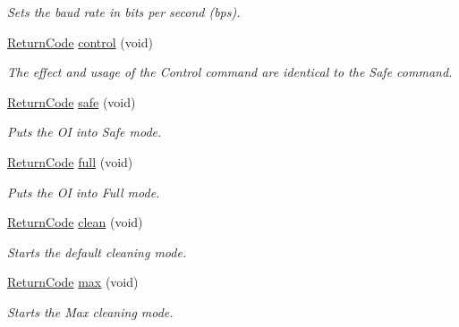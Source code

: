 \begin{DoxyCompactItemize}
\begin{DoxyCompactList}\small\item\em Sets the baud rate in bits per second (bps). \end{DoxyCompactList}\item 
\hyperlink{classroomba_1_1series500_1_1oi_1_1_o_i_encoder_ac2c8ad2f0306050926f89882d74696cc}{Return\+Code} \hyperlink{classroomba_1_1series500_1_1oi_1_1_o_i_encoder_ad32a31a2fb7e5457685428949f14d25c}{control} (void)
\begin{DoxyCompactList}\small\item\em The effect and usage of the Control command are identical to the Safe command. \end{DoxyCompactList}\item 
\hyperlink{classroomba_1_1series500_1_1oi_1_1_o_i_encoder_ac2c8ad2f0306050926f89882d74696cc}{Return\+Code} \hyperlink{classroomba_1_1series500_1_1oi_1_1_o_i_encoder_a01413ddf9d88eb62229dad6d4ed1801d}{safe} (void)
\begin{DoxyCompactList}\small\item\em Puts the O\+I into Safe mode. \end{DoxyCompactList}\item 
\hyperlink{classroomba_1_1series500_1_1oi_1_1_o_i_encoder_ac2c8ad2f0306050926f89882d74696cc}{Return\+Code} \hyperlink{classroomba_1_1series500_1_1oi_1_1_o_i_encoder_aab8b00ade2c7a6fb9568ef1920734b5a}{full} (void)
\begin{DoxyCompactList}\small\item\em Puts the O\+I into Full mode. \end{DoxyCompactList}\item 
\hyperlink{classroomba_1_1series500_1_1oi_1_1_o_i_encoder_ac2c8ad2f0306050926f89882d74696cc}{Return\+Code} \hyperlink{classroomba_1_1series500_1_1oi_1_1_o_i_encoder_a93e858788e85afdf4a04237eb5c526e0}{clean} (void)
\begin{DoxyCompactList}\small\item\em Starts the default cleaning mode. \end{DoxyCompactList}\item 
\hyperlink{classroomba_1_1series500_1_1oi_1_1_o_i_encoder_ac2c8ad2f0306050926f89882d74696cc}{Return\+Code} \hyperlink{classroomba_1_1series500_1_1oi_1_1_o_i_encoder_a027e42d59c0ae1131928f2c42f076340}{max} (void)
\begin{DoxyCompactList}\small\item\em Starts the Max cleaning mode. \end{DoxyCompactList}\item 

\end{DoxyCompactItemize}
